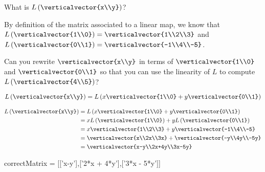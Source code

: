 \documentclass{ximera}
\begin{document}
\begin{question}
  
  What is $L\left(\verticalvector{x\\y}\right)$?

  \begin{solution}
  \begin{hint}
  		By definition of the matrix associated to a linear map, we know that $L\left(\verticalvector{1\\0}\right) = \verticalvector{1\\2\\3}$
  		and $L\left(\verticalvector{0\\1}\right) = \verticalvector{-1\\4\\-5}$.
  	\end{hint}
  	\begin{hint}
  		Can you rewrite $\verticalvector{x\\y}$ in terms of $\verticalvector{1\\0}$ and $\verticalvector{0\\1}$ so that you can use the linearity
  		of $L$ to compute $L\left(\verticalvector{4\\5}\right)$?
  	\end{hint}
  	\begin{hint}
  		$L\left(\verticalvector{x\\y}\right) = L\left(x\verticalvector{1\\0}+y\verticalvector{0\\1}\right)$
  	\end{hint}
  	\begin{hint}
  		\begin{align*}
  		L\left(\verticalvector{x\\y}\right) &= L\left(x\verticalvector{1\\0}+y\verticalvector{0\\1}\right)\\
  		&= xL\left(\verticalvector{1\\0}\right)+yL\left(\verticalvector{0\\1}\right)\\
  		&=x\verticalvector{1\\2\\3}+y\verticalvector{-1\\4\\-5}\\
  		&=\verticalvector{x\\2x\\3x}+\verticalvector{-y\\4y\\-5y}\\
  		&=\verticalvector{x-y\\2x+4y\\3x-5y}
  		\end{align*}
  	\end{hint}
    \begin{matrix-answer}[name=w]
      correctMatrix = [['x-y'],['2*x + 4*y'],['3*x - 5*y']]
    \end{matrix-answer}          
  \end{solution}
\end{question}
\end{document}
